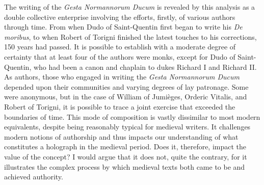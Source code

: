 \begin{paper}
The writing of the \emph{Gesta Normannorum Ducum} is revealed by this
analysis as a double collective enterprise involving the efforts,
firstly, of various authors through time. From when Dudo of
Saint-Quentin first began to write his \emph{De moribus}, to when Robert
of Torigni finished the latest touches to his corrections, 150 years had
passed. It is possible to establish with a moderate degree of certainty
that at least four of the authors were monks, except for Dudo of
Saint-Quentin, who had been a canon and chaplain to dukes Richard I and
Richard II. As authors, those who engaged in writing the \emph{Gesta
Normannorum Ducum} depended upon their communities and varying degrees
of lay patronage. Some were anonymous, but in the case of William of
Jumièges, Orderic Vitalis, and Robert of Torigni, it is possible to trace
a joint exercise that exceeded the boundaries of time. This mode of
composition is vastly dissimilar to most modern equivalents, despite
being reasonably typical for medieval writers. It challenges modern
notions of authorship and thus impacts our understanding of what
constitutes a holograph in the medieval period. Does it, therefore,
impact the value of the concept? I would argue that it does not, quite
the contrary, for it illustrates the complex process by which medieval
texts both came to be and achieved authority.


\end{paper}
